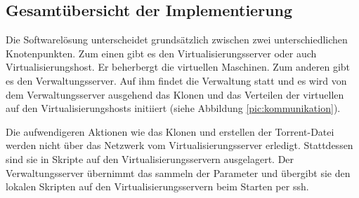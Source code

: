 \subsection{Gesamtübersicht der Implementierung}
Die Softwarelösung unterscheidet grundsätzlich zwischen zwei unterschiedlichen Knotenpunkten. Zum einen gibt es den Virtualisierungsserver oder auch Virtualisierungshost. Er beherbergt die virtuellen Maschinen. Zum anderen gibt es den Verwaltungsserver. Auf ihm findet die Verwaltung statt und es wird von dem Verwaltungsserver ausgehend das Klonen und das Verteilen der virtuellen auf den Virtualisierungshosts initiiert (siehe Abbildung \ref{pic:kommunikation}).


Die aufwendigeren Aktionen wie das Klonen und erstellen der Torrent-Datei werden nicht über das Netzwerk vom Virtualisierungsserver erledigt. Stattdessen sind sie in Skripte auf den Virtualisierungsservern ausgelagert. Der Verwaltungsserver übernimmt das sammeln der Parameter und übergibt sie den lokalen Skripten auf den Virtualisierungsservern beim Starten per ssh.